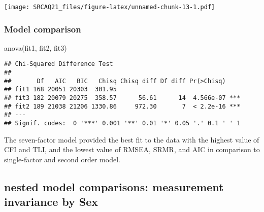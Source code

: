 \documentclass[
]{article}
\newenvironment{Shaded}{\begin{snugshade}}{\end{snugshade}}
\newcommand{\FunctionTok}[1]{\textcolor[rgb]{0.00,0.00,0.00}{#1}}
\newcommand{\NormalTok}[1]{#1}
\begin{document}
\texttt{[image: SRCAQ21\_files/figure-latex/unnamed-chunk-13-1.pdf]}

\hypertarget{model-comparison}{%
\subsubsection{Model comparison}\label{model-comparison}}

\begin{Shaded}
\begin{Highlighting}[]
\FunctionTok{anova}\NormalTok{(fit1, fit2, fit3)}
\end{Highlighting}
\end{Shaded}

\begin{verbatim}
## Chi-Squared Difference Test
## 
##       Df   AIC   BIC   Chisq Chisq diff Df diff Pr(>Chisq)    
## fit1 168 20051 20303  301.95                                  
## fit3 182 20079 20275  358.57      56.61      14  4.566e-07 ***
## fit2 189 21038 21206 1330.86     972.30       7  < 2.2e-16 ***
## ---
## Signif. codes:  0 '***' 0.001 '**' 0.01 '*' 0.05 '.' 0.1 ' ' 1
\end{verbatim}

The seven-factor model provided the best fit to the data with the
highest value of CFI and TLI, and the lowest value of RMSEA, SRMR, and
AIC in comparison to single-factor and second order model.

\hypertarget{nested-model-comparisons-measurement-invariance-by-sex}{%
\subsection{nested model comparisons: measurement invariance by
Sex}\label{nested-model-comparisons-measurement-invariance-by-sex}}
\end{document}
